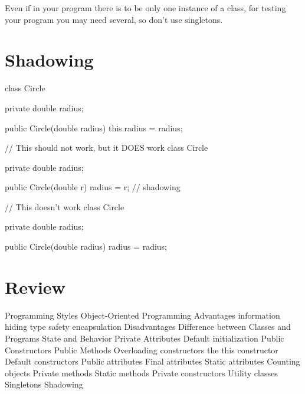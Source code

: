 \documentclass[a4paper, 9pt]{extarticle}
\begin{document}
Even if in your program there is to be only one instance of a class, for
testing your program you may need several, so don't use singletons.








\section{Shadowing}

\begin{multicols}{2}
\begin{blackboard}
class Circle {
  private double radius;

  public Circle(double radius) {
    this.radius = radius;
  }
}
\end{blackboard}
\columnbreak
\begin{blackboard}
// This should not work, but it DOES work
class Circle {
  private double radius;

  public Circle(double r) {
    radius = r;    // shadowing
  }
}
\end{blackboard}
\end{multicols}

\begin{blackboard}
// This doesn't work
class Circle {
  private double radius;

  public Circle(double radius) {
    radius = radius;
  }
}
\end{blackboard}














\section{Review}

\begin{blackboard}
Programming Styles
Object-Oriented Programming
  Advantages
    information hiding
    type safety
    encapsulation
  Disadvantages
Difference between Classes and Programs
State and Behavior
Private Attributes
  Default initialization
Public Constructors
Public Methods
Overloading constructors
the this constructor
Default constructors
Public attributes
Final attributes
Static attributes
  Counting objects
Private methods
Static methods
Private constructors
  Utility classes
  Singletons
Shadowing
\end{blackboard}
\end{document}
